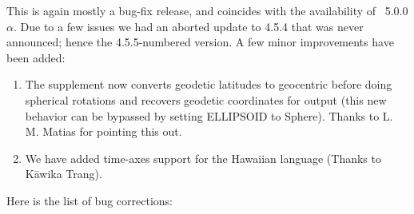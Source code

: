 This is again mostly a bug-fix release, and coincides with the availability of \GMT\ 5.0.0$\alpha$.
Due to a few issues we had an aborted update to 4.5.4 that was never announced; hence the 4.5.5-numbered version.
A few minor improvements have been added:

\begin{enumerate}
\item The  supplement now converts geodetic latitudes to geocentric before
doing spherical rotations and recovers geodetic coordinates for output (this new behavior can
be bypassed by setting ELLIPSOID to Sphere).  Thanks to L. M. Matias for pointing this out.
\item We have added time-axes support for the Hawaiian language (Thanks to K\=awika Trang).
\end{enumerate}
Here is the list of bug corrections:
